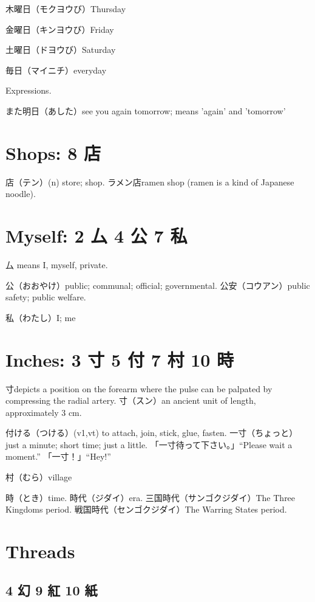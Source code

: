 木曜日（モクヨウび）Thursday

金曜日（キンヨウび）Friday

土曜日（ドヨウび）Saturday

毎日（マイニチ）everyday

Expressions.

また明日（あした）see you again tomorrow; means 'again' and 'tomorrow'

\section{Shops: 8 店}

店（テン）(n) store; shop.
ラメン店ramen shop (ramen is a kind of Japanese noodle).

\section{Myself: 2 厶 4 公 7 私}

厶 means I, myself, private.

公（おおやけ）public; communal; official; governmental.
公安（コウアン）public safety; public welfare.

私（わたし）I; me

\section{Inches: 3 寸 5 付 7 村 10 時}

寸depicts a position on the forearm
where the pulse can be palpated by compressing the radial artery.
寸（スン）an ancient unit of length, approximately 3 cm.

付ける（つける）(v1,vt) to attach, join, stick, glue, fasten.
一寸（ちょっと）just a minute; short time; just a little.
「一寸待って下さい。」``Please wait a moment.''
「一寸！」``Hey!''

村（むら）village

時（とき）time.
時代（ジダイ）era.
三国時代（サンゴクジダイ）The Three Kingdoms period.
戦国時代（センゴクジダイ）The Warring States period.

\section{Threads}

\subsection{4 幻 9 紅 10 紙}

